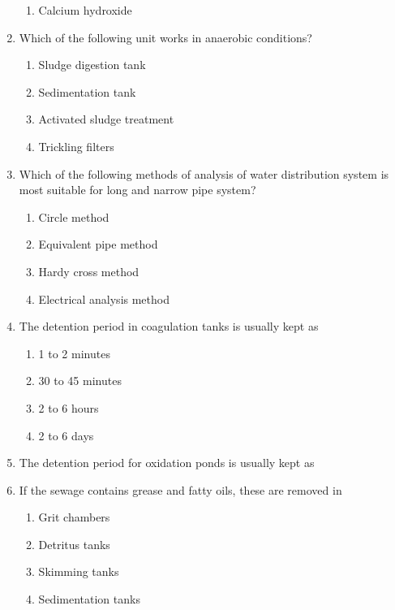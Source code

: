 \documentclass[11pt,a4paper]{article}
\begin{document}
\begin{enumerate}
\begin{enumerate}[label=\Alph*.]
\item{Calcium hydroxide}
\end{enumerate}
\item{Which of the following unit works in anaerobic conditions?}
\begin{enumerate}[label=\Alph*.]
\item{Sludge digestion tank}
\item{Sedimentation tank}
\item{Activated sludge treatment}
\item{Trickling filters}
\end{enumerate}
\item{Which of the following methods of analysis of water distribution system is most suitable for long and narrow pipe system?}
\begin{enumerate}[label=\Alph*.]
\item{Circle method}
\item{Equivalent pipe method}
\item{Hardy cross method}
\item{Electrical analysis method}
\end{enumerate}
\item{The detention period in coagulation tanks is usually kept as}
\begin{enumerate}[label=\Alph*.]
\item{1 to 2 minutes}
\item{30 to 45 minutes}
\item{2 to 6 hours}
\item{2 to 6 days}
\end{enumerate}
\item{The detention period for oxidation ponds is usually kept as}
\\
\item{If the sewage contains grease and fatty oils, these are removed in}
\begin{enumerate}[label=\Alph*.]
\item{Grit chambers}
\item{Detritus tanks}
\item{Skimming tanks}
\item{Sedimentation tanks}

\end{enumerate}
\end{enumerate}
\end{document}
